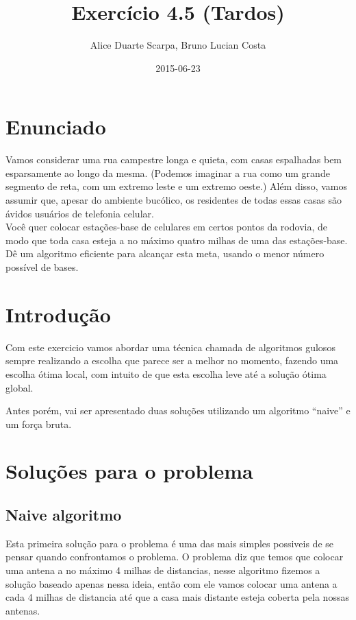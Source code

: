 \documentclass[11pt]{article}
\author{Alice Duarte Scarpa, Bruno Lucian Costa}
\date{2015-06-23}
\title{Exercício 4.5 (Tardos)}
\begin{document}
\maketitle

\section{Enunciado}
\label{sec-1}

Vamos considerar uma rua campestre longa e quieta, 
com casas espalhadas bem esparsamente ao longo da mesma. 
(Podemos imaginar a rua como um grande segmento de reta, 
com um extremo leste e um extremo oeste.) 
Além disso, vamos assumir que, apesar do ambiente bucólico, 
os residentes de todas essas casas são ávidos usuários de telefonia celular.
\\

\noindent
Você quer colocar estações-base de celulares em certos pontos da rodovia, 
de modo que toda casa esteja a no máximo quatro milhas de uma das estações-base. 
Dê um algoritmo eficiente para alcançar esta meta, usando o menor número possível de bases.



\section{Introdução}
\label{sec-2}

Com este exercicio vamos abordar uma técnica chamada de algoritmos gulosos
sempre realizando a escolha que parece ser a melhor no momento, fazendo uma escolha ótima local, 
com intuito de que esta escolha leve até a solução ótima global.

Antes porém, vai ser apresentado duas soluções utilizando um algoritmo ``naive'' e um força bruta. 


\section{Soluções para o problema}
\label{sec-3}



\subsection{Naive algoritmo}

Esta primeira solução para o problema é uma das mais simples possiveis de se pensar quando confrontamos o problema.
O problema diz que temos que colocar uma antena a no máximo 4 milhas de distancias, nesse algoritmo fizemos a solução 
baseado apenas nessa ideia, então com ele vamos colocar uma antena a cada 4 milhas de distancia até que a casa mais distante 
esteja coberta pela nossas antenas.
\end{document}
